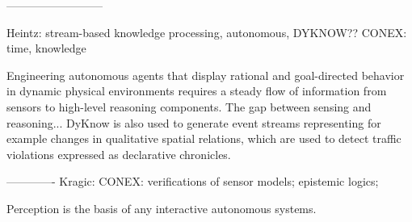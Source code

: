\documentclass[a4paper]{article}
\begin{document}
--------------------------


Heintz: stream-based knowledge processing, autonomous, DYKNOW??
CONEX: time, knowledge

Engineering autonomous agents that display rational and goal-directed behavior in dynamic physical environments requires a steady flow of information from sensors to high-level reasoning components. The gap between sensing and reasoning...
DyKnow is also used to generate event streams representing for example changes in qualitative spatial relations, which are used to detect traffic violations expressed as declarative chronicles. 

-------------
Kragic:
CONEX: verifications of sensor models; epistemic logics; 

Perception is the basis of any interactive autonomous systems.
\end{document}
